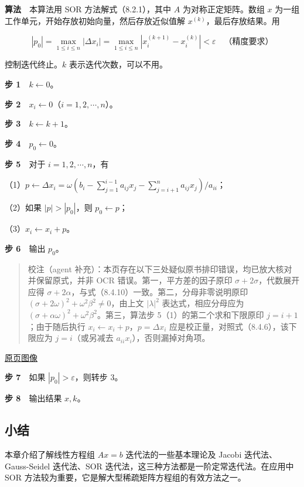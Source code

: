 \documentclass[
  10pt,
  fontset=fandol]{ctexart}
\begin{document}
\textbf{算法}　本算法用 SOR 方法解式（8.2.1），其中 \(A\) 为对称正定矩阵。数组 \(x\) 为一组工作单元，开始存放初始向量，然后存放近似值解 \(x^{(k)}\)，最后存放结果。用

\[
|p_0|=\max_{1\leqslant i\leqslant n}|\Delta x_i|=\max_{1\leqslant i\leqslant n}|x_i^{(k+1)}-x_i^{(k)}|<\varepsilon\quad\text{（精度要求）}
\]

控制迭代终止。\(k\) 表示迭代次数，可以不用。

\textbf{步 1}　\(k\leftarrow0\)。

\textbf{步 2}　\(x_i\leftarrow0\)（\(i=1,2,\cdots,n\)）。

\textbf{步 3}　\(k\leftarrow k+1\)。

\textbf{步 4}　\(p_0\leftarrow0\)。

\textbf{步 5}　对于 \(i=1,2,\cdots,n\)，有

（1）\(p\leftarrow\Delta x_i=\omega\left(b_i-\displaystyle\sum_{j=1}^{i-1}a_{ij}x_j-\displaystyle\sum_{j=i+1}^n a_{ij}x_j\right)/a_{ii}\)；

（2）如果 \(|p|>|p_0|\)，则 \(p_0\leftarrow p\)；

（3）\(x_i\leftarrow x_i+p\)。

\textbf{步 6}　输出 \(p_0\)。

\begin{quote}
校注（agent 补充）：本页存在以下三处疑似原书排印错误，均已放大核对并保留原式，并非 OCR 错误。第一，平方差的因子原印 \(\sigma+2\sigma\)，代数展开应得 \(\sigma+2\alpha\)，与式（8.4.10）一致。第二，分母非零说明原印 \((\sigma+2\omega)^2+\omega^2\beta^2\neq0\)，由上文 \(|\lambda|^2\) 表达式，相应分母应为 \((\sigma+\alpha\omega)^2+\omega^2\beta^2\)。第三，算法步 5（1）的第二个求和下限原印 \(j=i+1\)；由于随后执行 \(x_i\leftarrow x_i+p\)，\(p=\Delta x_i\) 应是校正量，对照式（8.4.6），该下限应为 \(j=i\)（或另减去 \(a_{ii}x_i\)），否则漏掉对角项。
\end{quote}

\href{../../source-images/pdf-230.jpeg}{原页图像}

\textbf{步 7}　如果 \(|p_0|>\varepsilon\)，则转步 3。

\textbf{步 8}　输出结果 \(x,k\)。

\subsection{小结}\label{ux5c0fux7ed3}

本章介绍了解线性方程组 \(Ax=b\) 迭代法的一些基本理论及 Jacobi 迭代法、Gauss-Seidel 迭代法、SOR 迭代法，这三种方法都是一阶定常迭代法。在应用中 SOR 方法较为重要，它是解大型稀疏矩阵方程组的有效方法之一。
\end{document}
